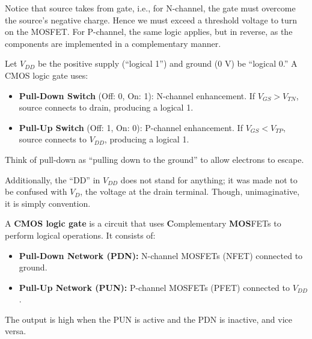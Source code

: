 \begin{Tip} Notice that source takes from gate, i.e., for N-channel, the gate must overcome the source's 
  negative charge. Hence we must exceed a threshold voltage to turn on the MOSFET.
  For P-channel, the same logic applies, but in reverse, as the components are implemented in a complementary manner.
\end{Tip}

\begin{Def}

  \label{def:pull_up_down_switches}

  Let $V_{DD}$ be the positive supply (“logical 1”) and ground (0 V) be “logical 0.”  A CMOS logic gate uses:
  \begin{itemize}
    \item \textbf{Pull-Down Switch} (Off: 0, On: 1): N-channel enhancement. If $V_{GS} > V_{TN}$, source connects to drain, producing a logical 1.
    \item \textbf{Pull-Up Switch} (Off: 1, On: 0): P-channel enhancement. If $V_{GS} < V_{TP}$, source connects to $V_{DD}$, producing a logical 1.
  \end{itemize}
\end{Def}
\begin{Tip} Think of pull-down as ``pulling down to the ground'' to allow electrons to escape.

  Additionally, the ``DD'' in $V_{DD}$ does not stand for anything; it was made not to be confused with 
  $V_D$, the voltage at the drain terminal. Though, unimaginative, it is simply convention.
\end{Tip}
\newpage 

\begin{Def}

  \label{def:cmos_logic_gate}

  A \textbf{CMOS logic gate} is a circuit that uses \textbf{C}omplementary \textbf{MOS}FETs to perform logical operations. It consists of:
  \begin{itemize}
    \item \textbf{Pull-Down Network (PDN):} N-channel MOSFETs (NFET) connected to ground.
    \item \textbf{Pull-Up Network (PUN):} P-channel MOSFETs (PFET) connected to $V_{DD}$.
  \end{itemize}
  
  \noindent
  The output is high when the PUN is active and the PDN is inactive, and vice versa.
\end{Def}

